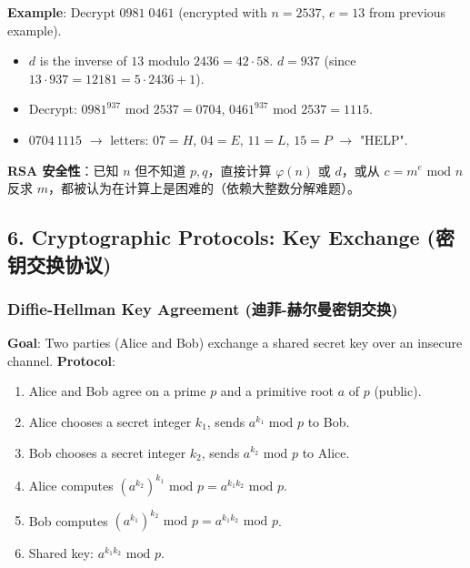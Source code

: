 \documentclass[10pt,a4paper,openany]{ctexbook}
\theoremstyle{definition}
\theoremstyle{remark}
\renewenvironment{quote}
  {\list{}{\leftmargin=1em\rightmargin=0pt\topsep=0.5pt\partopsep=0pt}\item[]}
  {\endlist}
\begin{document}
\textbf{Example}: Decrypt $0981\;0461$ (encrypted with $n=2537$, $e=13$ from previous example).
\begin{itemize}
\item $d$ is the inverse of $13$ modulo $2436 = 42 \cdot 58$. $d = 937$ (since $13 \cdot 937 = 12181 = 5 \cdot 2436 + 1$).
\item Decrypt: $0981^{937} \text{ mod } 2537 = 0704$, $0461^{937} \text{ mod } 2537 = 1115$.
\item $0704\,1115$ $\rightarrow$ letters: $07 = H$, $04 = E$, $11 = L$, $15 = P$ $\rightarrow$ "HELP".

\end{itemize}

\begin{quote}
\textbf{RSA 安全性}：已知 $n$ 但不知道 $p, q$，直接计算 $\varphi(n)$ 或 $d$，或从 $c = m^e \text{ mod } n$ 反求 $m$，都被认为在计算上是困难的（依赖大整数分解难题）。

\end{quote}
\vspace{-2pt}

\subsection{6. Cryptographic Protocols: Key Exchange (密钥交换协议)}

\subsubsection{Diffie-Hellman Key Agreement (迪菲-赫尔曼密钥交换)}

\textbf{Goal}: Two parties (Alice and Bob) exchange a shared secret key over an insecure channel.
\textbf{Protocol}:
\begin{enumerate}
\item Alice and Bob agree on a prime $p$ and a primitive root $a$ of $p$ (public).
\item Alice chooses a secret integer $k_1$, sends $a^{k_1} \text{ mod } p$ to Bob.
\item Bob chooses a secret integer $k_2$, sends $a^{k_2} \text{ mod } p$ to Alice.
\item Alice computes $(a^{k_2})^{k_1} \text{ mod } p = a^{k_1 k_2} \text{ mod } p$.
\item Bob computes $(a^{k_1})^{k_2} \text{ mod } p = a^{k_1 k_2} \text{ mod } p$.
\item Shared key: $a^{k_1 k_2} \text{ mod } p$.

\end{enumerate}
\end{document}
